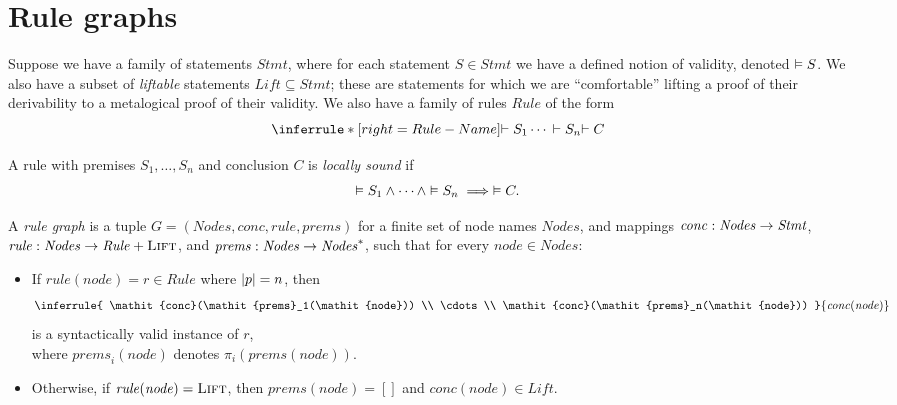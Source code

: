 
\section{Rule graphs}

\newcommand*{\DomLiftable}{\mathit{Lift}}
\newcommand*{\DomStmt}{\mathit{Stmt}}
\newcommand*{\DomRule}{\mathit{Rule}}
\newcommand*{\LIFT}{\textsc{Lift}}

Suppose we have a family of statements $\DomStmt$,
where for each statement $S \in \DomStmt$
we have a defined notion of validity,
denoted $\vDash S$.
%
We also have a subset of \emph{liftable} statements
$\DomLiftable \subseteq \DomStmt$;
these are statements for which
we are ``comfortable'' lifting a proof of their derivability
to a metalogical proof of their validity.
%
We also have a family of rules $\DomRule$ of the form
\[
    \inferrule*[right=Rule-Name]{
        \DER S_1 \\ \cdots \\ \DER S_n
    }{
        \DER C
    }
\]
%
\begin{definition}
    A rule with premises $S_1,\dots,S_n$ and conclusion $C$ is \emph{locally sound} if
    \[\vDash S_1 \wedge \cdots \wedge \vDash S_n \implies \vDash C.\]
\end{definition}
%

\newcommand*{\DomNode}{\mathit{Nodes}}
\newcommand*{\node}{\mathit{node}}
\newcommand*{\MapConc}{\mathit{conc}}
\newcommand*{\MapRule}{\mathit{rule}}
\newcommand*{\MapPrems}{\mathit{prems}}

\begin{definition}
A \emph{rule graph} is a tuple $G=(\DomNode,\MapConc,\MapRule,\MapPrems)$ for a
finite set of node names $\DomNode$,
and mappings %
    $\MapConc : \DomNode \ra \DomStmt$,
    $\MapRule : \DomNode \ra \DomRule + \LIFT$,
 and   $\MapPrems : \DomNode \ra \DomNode^*$,
such that for every $\node \in \DomNode$:
\begin{itemize}
\item If $\MapRule(\node) = r \in \DomRule$
    where $\left|p\right| = n$, then
    \[
        \inferrule{
            \MapConc(\MapPrems_1(\node))
            \\ \cdots \\
            \MapConc(\MapPrems_n(\node))
        }{ \MapConc(\node) }
    \]
    is a syntactically valid instance of $r$,\\
    where $\MapPrems_i(\node)$
    denotes $\pi_i(\MapPrems(\node))$.
\item Otherwise, if $\MapRule(\node) = \LIFT$,
    then $\MapPrems(\node) = []$ and 
    $\MapConc(\node) \in \DomLiftable$.
\end{itemize}
\end{definition}

